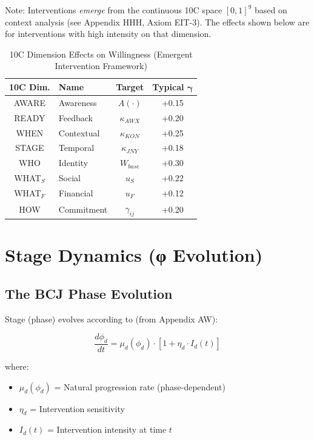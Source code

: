 Note: Interventions \textit{emerge} from the continuous 10C space $[0,1]^9$ based on context analysis (see Appendix HHH, Axiom EIT-3). The effects shown below are for interventions with high intensity on that dimension.

\begin{table}[htbp]
\centering
\caption{10C Dimension Effects on Willingness (Emergent Intervention Framework)}
\label{tab:intervention-effects}
\renewcommand{\arraystretch}{1.3}
\begin{tabular}{@{}clcc@{}}
\toprule
\textbf{10C Dim.} & \textbf{Name} & \textbf{Target} & \textbf{Typical $\boldsymbol{\gamma}$} \\
\midrule
AWARE & Awareness & $A(\cdot)$ & +0.15 \\
READY & Feedback & $\kappa_{AWX}$ & +0.20 \\
WHEN & Contextual & $\kappa_{KON}$ & +0.25 \\
STAGE & Temporal & $\kappa_{JNY}$ & +0.18 \\
WHO & Identity & $W_{base}$ & +0.30 \\
WHAT$_S$ & Social & $u_S$ & +0.22 \\
WHAT$_F$ & Financial & $u_F$ & +0.12 \\
HOW & Commitment & $\gamma_{ij}$ & +0.20 \\
\bottomrule
\end{tabular}
\end{table}


\section{Stage Dynamics (φ Evolution)}
\label{sec:calc-stage}

\subsection{The BCJ Phase Evolution}

Stage (phase) evolves according to (from Appendix AW):

\begin{equation}
\boxed{
\frac{d\phi_d}{dt} = \mu_d(\phi_d) \cdot [1 + \eta_d \cdot I_d(t)]
}
\label{eq:phase-ode}
\end{equation}

where:
\begin{itemize}
\item $\mu_d(\phi_d)$ = Natural progression rate (phase-dependent)
\item $\eta_d$ = Intervention sensitivity
\item $I_d(t)$ = Intervention intensity at time $t$
\end{itemize}

